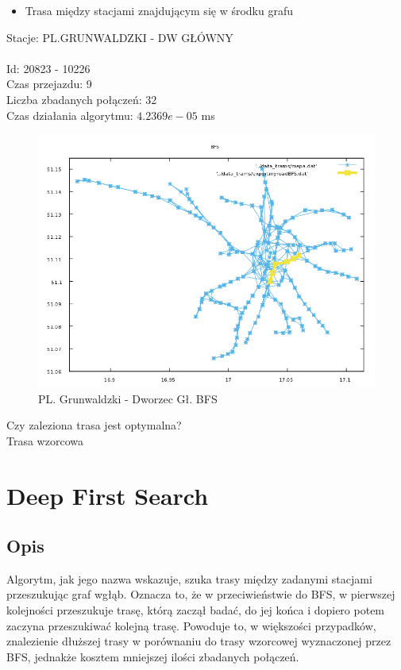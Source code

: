 \documentclass[13pt]{article}
\begin{document}
\newpage
\begin{itemize}
\item Trasa między stacjami znajdującym się w środku grafu
\end{itemize}
\hspace{1.5cm} Stacje: PL.GRUNWALDZKI - DW GŁÓWNY \\\\
Id: 20823  - 10226\\
Czas przejazdu: 9\\
Liczba zbadanych połączeń: 32\\
Czas działania algorytmu: $4.2369e-05$ ms\\
\begin{figure}[hp]
\centering
\includegraphics[width=1\textwidth]{wykresy/PLA_GLO_BFS.png}
\caption{PL. Grunwaldzki - Dworzec Gł. BFS}
\end{figure}

Czy zaleziona trasa jest optymalna?\\
Trasa wzorcowa

\newpage

\section{Deep First Search}

\subsection{Opis}
Algorytm, jak jego nazwa wskazuje, szuka trasy między zadanymi stacjami przeszukując graf wgłąb. Oznacza to, że w przeciwieństwie do BFS, w  pierwszej kolejności przeszukuje trasę, którą zaczął badać, do jej końca i dopiero potem zaczyna przeszukiwać kolejną trasę. Powoduje to, w większości przypadków, znalezienie dłuższej trasy w porównaniu do trasy wzorcowej wyznaczonej przez BFS, jednakże kosztem mniejszej ilości zbadanych połączeń. 
\end{document}
